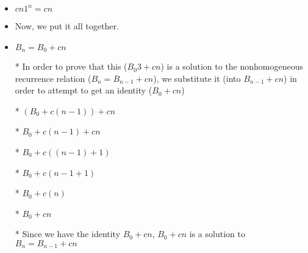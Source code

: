 \documentclass{article}
\begin{document}
\begin{enumerate}
\begin{enumerate}
\begin{itemize}
    \item $cn1^{n}=cn$
    \item Now, we put it all together.
    \item $B_{n}=B_{0}+cn$
    \item [*] In order to prove that this ($B_{0}3+cn$) is a solution to the nonhomogeneous recurrence relation ($B_{n}=B_{n-1}+cn$), we substitute it (into $B_{n-1}+cn$) in order to attempt to get an identity ($B_{0}+cn$)
    \item [*] $(B_{0}+c(n-1))+cn$
    \item [*] $B_{0}+c(n-1)+cn$
    \item [*] $B_{0}+c((n-1)+1)$
    \item [*] $B_{0}+c(n-1+1)$
    \item [*] $B_{0}+c(n)$
    \item [*] $B_{0}+cn$
    \item [*] Since we have the identity $B_{0}+cn$, $B_{0}+cn$ is a solution to $B_{n}=B_{n-1}+cn$
    \end{itemize}
  \end{enumerate}

\end{enumerate}
\end{document}
